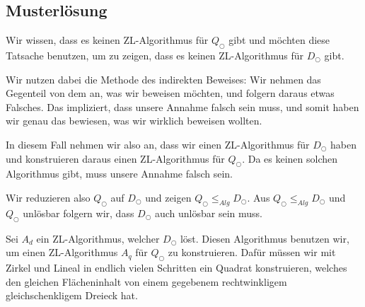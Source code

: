 \documentclass[
	12pt, %
	german, %
]{fphw}
\begin{document}

\subsection*{Musterlösung}

Wir wissen, dass es keinen ZL-Algorithmus für \(Q_{\bigcirc}\) gibt und möchten diese Tatsache benutzen, um zu zeigen, dass es keinen ZL-Algorithmus für \(D_{\bigcirc}\) gibt.

Wir nutzen dabei die Methode des indirekten Beweises: Wir nehmen das Gegenteil von dem an, was wir beweisen möchten, und folgern daraus etwas Falsches. Das impliziert, dass unsere Annahme falsch sein muss, und somit haben wir genau das bewiesen, was wir wirklich beweisen wollten.

In diesem Fall nehmen wir also an, dass wir einen ZL-Algorithmus für \(D_{\bigcirc}\) haben und konstruieren daraus einen ZL-Algorithmus für \(Q_{\bigcirc}\). Da es keinen solchen Algorithmus gibt, muss unsere Annahme falsch sein.

Wir reduzieren also \(Q_{\bigcirc}\) auf \(D_{\bigcirc}\) und zeigen \(Q_{\bigcirc} \leq_{Alg} D_{\bigcirc}\). Aus \(Q_{\bigcirc} \leq_{Alg} D_{\bigcirc}\) und \(Q_{\bigcirc}\) unlösbar folgern wir, dass \(D_{\bigcirc}\) auch unlösbar sein muss.

Sei \(A_d\) ein ZL-Algorithmus, welcher \(D_{\bigcirc}\) löst. Diesen Algorithmus benutzen wir, um einen ZL-Algorithmus \(A_q\) für \(Q_{\bigcirc}\) zu konstruieren. Dafür müssen wir mit Zirkel und Lineal in endlich vielen Schritten ein Quadrat konstruieren, welches den gleichen Flächeninhalt von einem gegebenem rechtwinkligem gleichschenkligem Dreieck hat.
\end{document}
